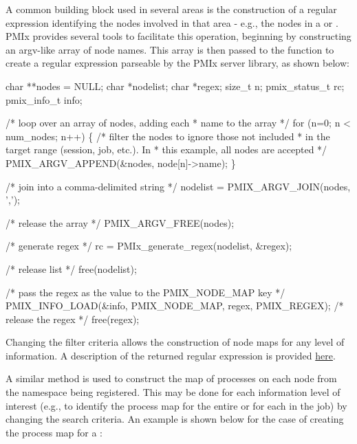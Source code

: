 \label{cptr:api_server:noderegex}A common building block used in several areas is the construction of a regular expression identifying the nodes involved in that area - e.g., the nodes in a  or . \ac{PMIx} provides several tools to facilitate this operation, beginning by constructing an argv-like array of node names. This array is then passed to the  function to create a regular expression parseable by the \ac{PMIx} server library, as shown below:

\cspecificstart
\begin{codepar}
char **nodes = NULL;
char *nodelist;
char *regex;
size_t n;
pmix_status_t rc;
pmix_info_t info;

/* loop over an array of nodes, adding each
 * name to the array */
for (n=0; n < num_nodes; n++) \{
    /* filter the nodes to ignore those not included
     * in the target range (session, job, etc.). In
     * this example, all nodes are accepted */
    PMIX_ARGV_APPEND(&nodes, node[n]->name);
\}

/* join into a comma-delimited string */
nodelist = PMIX_ARGV_JOIN(nodes, ',');

/* release the array */
PMIX_ARGV_FREE(nodes);

/* generate regex */
rc = PMIx_generate_regex(nodelist, &regex);

/* release list */
free(nodelist);

/* pass the regex as the value to the PMIX_NODE_MAP key */
PMIX_INFO_LOAD(&info, PMIX_NODE_MAP, regex, PMIX_REGEX);
/* release the regex */
free(regex);
\end{codepar}
\cspecificend

Changing the filter criteria allows the construction of node maps for any level of information. A description of the returned regular expression is provided \hyperref[regex:fmt]{here}.

\label{cptr:api_server:ppnregex}A similar method is used to construct the map of processes on each node from the namespace being registered. This may be done for each information level of interest (e.g., to identify the process map for the entire  or for each  in the job) by changing the search criteria. An example is shown below for the case of creating the process map for a :

